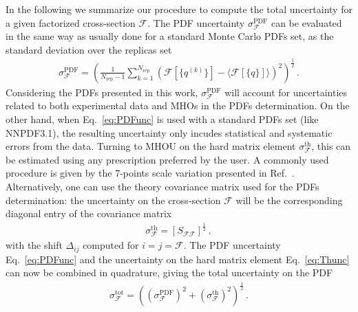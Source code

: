     In the following we summarize our procedure to compute the total uncertainty for a given factorized
    cross-section $\mathcal{F}$.
    The PDF uncertainty $\sigma_{\mathcal{F}}^{\text{PDF}}$ can be evaluated in the same way as usually done
    for a standard Monte Carlo PDFs set, as the standard deviation over the replicas set
    \begin{align}
        \label{eq:PDFunc}
        \sigma_{\mathcal{F}}^{\text{PDF}} = 
        \left(\frac{1}{N_{\text{rep}}-1} \sum_{k=1}^{N_{\text{rep}}}
        \left(\mathcal{F}\left[\{q^{(k)}\}\right]-\langle \mathcal{F}\left[\{q\}\right] \rangle\right)^2
         \right)^{\frac{1}{2}}\,.
    \end{align}
    Considering the PDFs presented in this work, $\sigma_{\mathcal{F}}^{\text{PDF}}$ will account for
    uncertainties related to both experimental data and MHOs in the PDFs determination.
    On the other hand, when Eq.~\ref{eq:PDFunc} is used with a standard PDFs set (like NNPDF3.1), the resulting
    uncertainty only incudes statistical and systematic errors from the data. 
    Turning to MHOU on the hard matrix element $\sigma_{\mathcal{F}}^{\text{th}}$,
    this can be estimated using any prescription preferred by the user.
    A commonly used procedure is given by the 7-points scale variation presented in Ref.~\cite{deFlorian:2016spz}.
    Alternatively, one can use the theory covariance matrix used for the PDFs determination: the uncertainty 
    on the cross-section $\mathcal{F}$ will be the corresponding diagonal entry of the covariance matrix
    \begin{align}
        \label{eq:Thunc}
        \sigma_{\mathcal{F}}^{\text{th}} = \left[S_{\mathcal{F}\mathcal{F}}\right]^{\frac{1}{2}}\,,
    \end{align} 
    with the shift $\Delta_{ij}$ computed for $i=j = \mathcal{F}$.
    The PDF uncertainty Eq.~\ref{eq:PDFunc} and the uncertainty on the hard matrix element Eq.~\ref{eq:Thunc}
    can now be combined in quadrature, giving the total uncertainty on the PDF
    \begin{align}
        \label{eq:TOTunc}
        \sigma_{\mathcal{F}}^{\text{tot}} 
        = \left(\left(\sigma_{\mathcal{F}}^{\text{PDF}}\right)^2 +
        \left(\sigma_{\mathcal{F}}^{\text{th}}\right)^2\right)^{\frac{1}{2}}\,.
    \end{align}



    

    
    